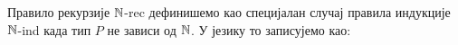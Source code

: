 Правило рекурзије ${\mathbb{N}}$-rec дефинишемо као специјалан случај правила индукције ${\mathbb{N}}$-ind када тип $P$ не зависи од ${\mathbb{N}}$. У језику  то записујемо као:
\begin{code}%
\>[0]%
\>[1751I]\AgdaSymbol{:}\AgdaSpace{}%
\AgdaSymbol{(}\AgdaSpace{}%
\AgdaSymbol{:}\AgdaSpace{}%
\AgdaSpace{}%
\AgdaSpace{}%
\AgdaSymbol{)}\<%
\\
\>[.][@{}l@{}]\<[1751I]%
\>[12]\AgdaSpace{}%
\<%
\\
%
\>[12]\AgdaSpace{}%
\AgdaSymbol{(}\AgdaSpace{}%
\AgdaSpace{}%
\AgdaSpace{}%
\AgdaSpace{}%
\AgdaSymbol{)}\<%
\\
%
\>[12]\AgdaSpace{}%
\AgdaSpace{}%
\AgdaSpace{}%
\<%
\\
\>[0]\AgdaSpace{}%
\AgdaSpace{}%
\AgdaSymbol{=}\AgdaSpace{}%
\AgdaSpace{}%
\AgdaSpace{}%
\AgdaBound{\AgdaUnderscore{}}\AgdaSpace{}%
\AgdaSpace{}%
\AgdaSymbol{)}\<%
\end{code}

